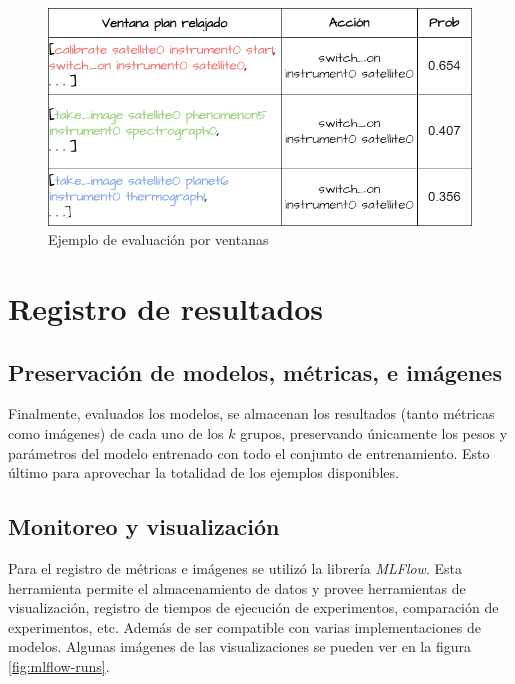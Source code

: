\begin{figure}[t!]
    \centering
    \includegraphics[width=\linewidth]{figures/aggregation_example.png}
    \caption{Ejemplo de evaluación por ventanas}
    \label{fig:window_example_evaluation}
\end{figure}

\section{Registro de resultados}

\subsection{Preservación de modelos, métricas, e imágenes}

Finalmente, evaluados los modelos, se almacenan los resultados (tanto métricas
como imágenes) de cada uno de los $k$ grupos, preservando únicamente los pesos y
parámetros del modelo entrenado con todo el conjunto de entrenamiento. Esto
último para aprovechar la totalidad de los ejemplos disponibles.

\subsection{Monitoreo y visualización}

Para el registro de métricas e imágenes se utilizó la librería \emph{MLFlow}.
 Esta herramienta permite el almacenamiento de datos y provee herramientas de
 visualización, registro de tiempos de ejecución de experimentos, comparación de
 experimentos, etc. Además de ser compatible con varias implementaciones de
 modelos. Algunas imágenes de las visualizaciones se pueden ver en la figura
 \ref{fig:mlflow-runs}.

